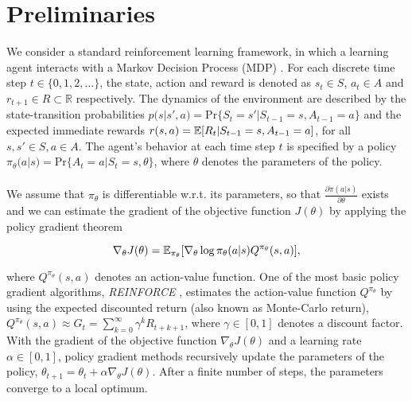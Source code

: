 \section{Preliminaries}
\label{sec:preliminaries}

We consider a standard reinforcement learning framework, in which a learning agent interacts with a Markov Decision Process (MDP) \citep{howard1960dynamic, sutton2018reinforcement}. For each discrete time step $t \in \{0,1,2,...\}$, the state, action and reward is denoted as $s_t \in \mathit{S}$, $a_t \in A$ and $r_{t+1} \in \mathit{R} \subset \mathbb{R}$ respectively. The dynamics of the environment are described by the state-transition probabilities $p(s|s', a) = \text{Pr}\{S_t = s' | S_{t-1} = s, A_{t-1} = a\}$ and the expected immediate rewards $r(s, a) = \operatorname{\mathbb{E}}[R_t | S_{t-1} = s, A_{t-1} = a]$, for all $s, s' \in S, a \in A$. The agent's behavior at each time step $t$ is specified by a policy $\pi_{\theta}(a|s) = \text{Pr}\{A_t = a | S_{t} = s, \theta\}$, where $\theta$ denotes the parameters of the policy. 
\\\\
We assume that $\pi_\theta$ is differentiable w.r.t. its parameters, so that $\tfrac{\partial\pi(a|s)}{\partial \theta}$ exists and we can estimate the gradient of the objective function $J(\theta)$ by applying the policy gradient theorem \citep{sutton2000policy}

\begin{equation}
\label{equ:policygradienttheorem}
\nabla_{\theta}J(\theta)=\operatorname{\mathbb{E}}_{\pi_{\theta}}[\nabla_{\theta}\log\pi_{\theta}(a|s) Q^{\pi_{\theta}}(s, a)],
\end{equation}

\noindent where $Q^{\pi_{\theta}}(s, a)$ denotes an action-value function. One of the most basic policy gradient algorithms, \textit{REINFORCE} \citep{williams1992simple}, estimates the action-value function $Q^{\pi_{\theta}}$ by using the expected discounted return (also known as Monte-Carlo return), \(Q^{\pi_\theta}(s, a) \approx \mathit{G}_t = \sum_{k=0}^{\infty}\gamma^k R_{t+k+1}\),
where $\gamma \in [0, 1]$ denotes a discount factor. With the gradient of the objective function $\nabla_{\theta}J(\theta)$ and a learning rate $\alpha \in \left[0,1\right]$, policy gradient methods recursively update the parameters of the policy, $\theta_{t+1} = \theta_t + \alpha \nabla_{\theta} J(\theta)$. After a finite number of steps, the parameters converge to a local optimum. 

